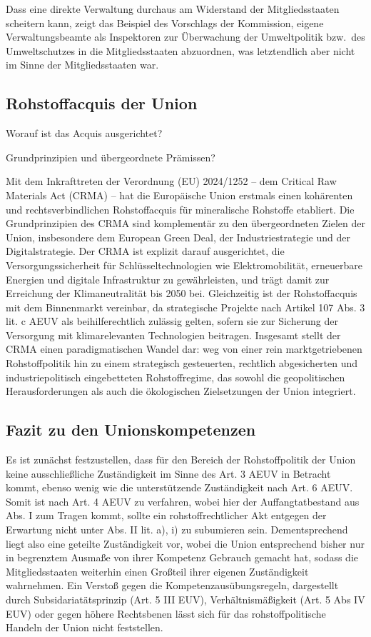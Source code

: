 \documentclass[12pt,a4paper,oneside]{book} %
\begin{document}
	Dass eine direkte Verwaltung durchaus am Widerstand der Mitgliedsstaaten scheitern kann, zeigt das Beispiel des Vorschlags der Kommission, eigene Verwaltungsbeamte als Inspektoren zur Überwachung der Umweltpolitik bzw.\, des Umweltschutzes in die Mitgliedsstaaten abzuordnen, was letztendlich aber nicht im Sinne der Mitgliedsstaaten war.\autocite{Dauses/Ludwigs, O. Umweltpolitik, Rn. 226}
	
	\subsection{Rohstoffacquis der Union}
	
	Worauf ist das Acquis ausgerichtet?
	
	Grundprinzipien und übergeordnete Prämissen?
	
	Mit dem Inkrafttreten der Verordnung (EU) 2024/1252 – dem Critical Raw Materials Act (CRMA) – hat die Europäische Union erstmals einen kohärenten und rechtsverbindlichen Rohstoffacquis für mineralische Rohstoffe etabliert. Die Grundprinzipien des CRMA sind komplementär zu den übergeordneten Zielen der Union, insbesondere dem European Green Deal, der Industriestrategie und der Digitalstrategie. Der CRMA ist explizit darauf ausgerichtet, die Versorgungssicherheit für Schlüsseltechnologien wie Elektromobilität, erneuerbare Energien und digitale Infrastruktur zu gewährleisten, und trägt damit zur Erreichung der Klimaneutralität bis 2050 bei. Gleichzeitig ist der Rohstoffacquis mit dem Binnenmarkt vereinbar, da strategische Projekte nach Artikel 107 Abs. 3 lit. c AEUV als beihilferechtlich zulässig gelten, sofern sie zur Sicherung der Versorgung mit klimarelevanten Technologien beitragen. Insgesamt stellt der CRMA einen paradigmatischen Wandel dar: weg von einer rein marktgetriebenen Rohstoffpolitik hin zu einem strategisch gesteuerten, rechtlich abgesicherten und industriepolitisch eingebetteten Rohstoffregime, das sowohl die geopolitischen Herausforderungen als auch die ökologischen Zielsetzungen der Union integriert.
	
	\subsection{Fazit zu den Unionskompetenzen}
	Es ist zunächst festzustellen, dass für den Bereich der Rohstoffpolitik der Union keine ausschließliche Zuständigkeit im Sinne des Art. 3 AEUV in Betracht kommt, ebenso wenig wie die unterstützende Zuständigkeit nach Art. 6 AEUV. Somit ist nach Art. 4 AEUV zu verfahren, wobei hier der Auffangtatbestand aus Abs. I zum Tragen kommt, sollte ein rohstoffrechtlicher Akt entgegen der Erwartung nicht unter Abs. II lit. a), i) zu subumieren sein. Dementsprechend liegt also eine geteilte Zuständigkeit vor, wobei die Union entsprechend bisher nur in begrenztem Ausmaße von ihrer Kompetenz Gebrauch gemacht hat, sodass die Mitgliedsstaaten weiterhin einen Großteil ihrer eigenen Zuständigkeit wahrnehmen. Ein Verstoß gegen die Kompetenzausübungsregeln, dargestellt durch Subsidariatätsprinzip (Art. 5 III EUV), Verhältnismäßigkeit (Art. 5 Abs IV EUV) oder gegen höhere Rechtsbenen lässt sich für das rohstoffpolitische Handeln der Union nicht feststellen.
	
\end{document}
